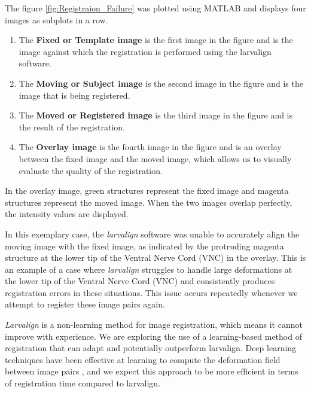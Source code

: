\documentclass{report}
\begin{document}
	The figure \ref{fig:Registraion_Failure} was plotted using MATLAB and displays four images as subplots in a row. 
	\begin{enumerate}
		\item The \textbf{Fixed or Template image} is the first image in the figure and is the image against which the registration is performed using the larvalign software.
		\item The \textbf{Moving or Subject image} is the second image in the figure and is the image that is being registered.
		\item The \textbf{Moved or Registered image} is the third image in the figure and is the result of the registration.
		\item The \textbf{Overlay image} is the fourth image in the figure and is an overlay between the fixed image and the moved image, which allows us to visually evaluate the quality of the registration.
	\end{enumerate}
	
	In the overlay image, green structures represent the fixed image and magenta structures represent the moved image. When the two images overlap perfectly, the intensity values are displayed.
	
	In this exemplary case, the \textit{larvalign} software was unable to accurately align the moving image with the fixed image, as indicated by the protruding magenta structure at the lower tip of the Ventral Nerve Cord (VNC) in the overlay. This is an example of a case where \textit{larvalign} struggles to handle large deformations at the lower tip of the Ventral Nerve Cord (VNC) and consistently produces registration errors in these situations. This issue occurs repeatedly whenever we attempt to register these image pairs again.
	
	\textit{Larvalign} is a non-learning method for image registration, which means it cannot improve with experience. We are exploring the use of a learning-based method of registration that can adapt and potentially outperform larvalign. Deep learning techniques have been effective at learning to compute the deformation field between image pairs \cite{Balakrishnan_2019, de_Vos_2019, Wu, Fu_2020, 10.1007/978-3-319-66182-7_27}, and we expect this approach to be more efficient in terms of registration time compared to larvalign.
	
\end{document}
